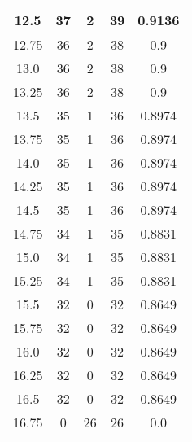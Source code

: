 \documentclass[letterpaper, 12pt]{article}
\begin{document}
\begin{longtable}{|c|c|c|c|c|}
12.5 & 37 & 2 & 39 & 0.9136 \\
\hline
12.75 & 36 & 2 & 38 & 0.9 \\
\hline
13.0 & 36 & 2 & 38 & 0.9 \\
\hline
13.25 & 36 & 2 & 38 & 0.9 \\
\hline
13.5 & 35 & 1 & 36 & 0.8974 \\
\hline
13.75 & 35 & 1 & 36 & 0.8974 \\
\hline
14.0 & 35 & 1 & 36 & 0.8974 \\
\hline
14.25 & 35 & 1 & 36 & 0.8974 \\
\hline
14.5 & 35 & 1 & 36 & 0.8974 \\
\hline
14.75 & 34 & 1 & 35 & 0.8831 \\
\hline
15.0 & 34 & 1 & 35 & 0.8831 \\
\hline
15.25 & 34 & 1 & 35 & 0.8831 \\
\hline
15.5 & 32 & 0 & 32 & 0.8649 \\
\hline
15.75 & 32 & 0 & 32 & 0.8649 \\
\hline
16.0 & 32 & 0 & 32 & 0.8649 \\
\hline
16.25 & 32 & 0 & 32 & 0.8649 \\
\hline
16.5 & 32 & 0 & 32 & 0.8649 \\
\hline
16.75 & 0 & 26 & 26 & 0.0 \\
\hline
\end{longtable}
\end{document}
